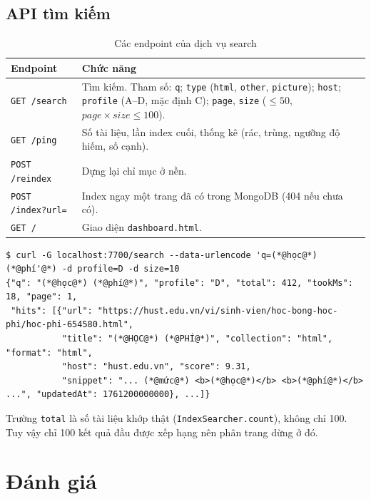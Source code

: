 \documentclass[12pt,a4paper]{report}
\begin{document}
\section{API tìm kiếm}

\begin{table}[ht]
\centering
\caption{Các endpoint của dịch vụ search}\label{tab:api}
\begin{tabularx}{\textwidth}{l L}
\toprule
Endpoint & Chức năng \\
\midrule
\texttt{GET /search} & Tìm kiếm. Tham số: \texttt{q}; \texttt{type} (\texttt{html}, \texttt{other}, \texttt{picture}); \texttt{host}; \texttt{profile} (A--D, mặc định C); \texttt{page}, \texttt{size} ($\le 50$, $\mathit{page}\times\mathit{size} \le 100$). \\
\texttt{GET /ping} & Số tài liệu, lần index cuối, thống kê (rác, trùng, ngưỡng độ hiếm, số cạnh). \\
\texttt{POST /reindex} & Dựng lại chỉ mục ở nền. \\
\texttt{POST /index?url=} & Index ngay một trang đã có trong MongoDB (404 nếu chưa có). \\
\texttt{GET /} & Giao diện \texttt{dashboard.html}. \\
\bottomrule
\end{tabularx}
\end{table}

\begin{lstlisting}[caption={Ví dụ truy vấn và kết quả}]
$ curl -G localhost:7700/search --data-urlencode 'q=(*@học@*) (*@phí'@*) -d profile=D -d size=10
{"q": "(*@học@*) (*@phí@*)", "profile": "D", "total": 412, "tookMs": 18, "page": 1,
 "hits": [{"url": "https://hust.edu.vn/vi/sinh-vien/hoc-bong-hoc-phi/hoc-phi-654580.html",
           "title": "(*@HỌC@*) (*@PHÍ@*)", "collection": "html", "format": "html",
           "host": "hust.edu.vn", "score": 9.31,
           "snippet": "... (*@mức@*) <b>(*@học@*)</b> <b>(*@phí@*)</b> ...", "updatedAt": 1761200000000}, ...]}
\end{lstlisting}

Trường \texttt{total} là số tài liệu khớp thật (\texttt{IndexSearcher.count}), không chỉ 100. Tuy vậy chỉ 100 kết quả
đầu được xếp hạng nên phân trang dừng ở đó.

\chapter{Đánh giá}\label{ch:eval}
\end{document}
